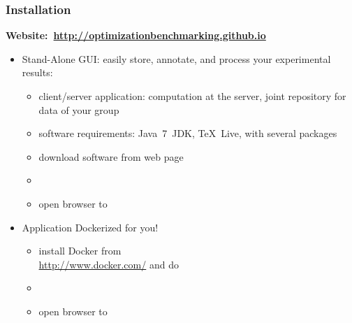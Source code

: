%
\begin{frame}[t]%
\frametitle{Installation}%
\centering\footnotesize%
%
\strut\vfill%
\mbox{\textbf{\large{Website:~\href{http://optimizationbenchmarking.github.io}{http://optimizationbenchmarking.github.io}}}}%
\vfill%
%
\begin{itemize}%
%
\item \alert{Stand-Alone GUI}: easily store, annotate, and process your experimental results:%
\begin{itemize}%
\item client/server application: computation at the server, joint repository for data of your group%
\item software requirements: Java~7~JDK, TeX~Live,  with several packages%
\item download software from web page%
\item \mbox{}%
\item open browser to %
\end{itemize}%
%
\vfill\vfill%
%
\item \alert{Application Dockerized for you!}%
\begin{itemize}%
\item install Docker from\\\url{http://www.docker.com/} and do%
\item \mbox{} \mbox{}%
\item open browser to %
\end{itemize}%
%
\vfill%
%
%
%
\end{itemize}%
%
\end{frame}%
%

